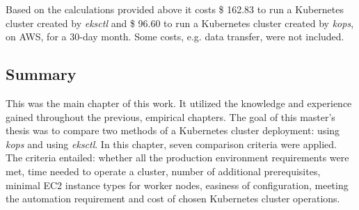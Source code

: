 Based on the calculations provided above it costs \$ 162.83 to run a Kubernetes cluster created by \textit{eksctl} and \$ 96.60 to run a Kubernetes cluster created by \textit{kops}, on AWS, for a 30-day month. Some costs, e.g. data transfer, were not included.




\subsection{Summary}

This was the main chapter of this work. It utilized the knowledge and experience gained throughout the previous, empirical chapters. The goal of this master's thesis was to compare two methods of a Kubernetes cluster deployment: using \textit{kops} and using \textit{eksctl}. In this chapter,  seven comparison criteria were applied. The criteria entailed: whether all the production environment requirements were met, time needed to operate a cluster, number of additional prerequisites, minimal EC2 instance types for worker nodes, easiness of configuration, meeting the automation requirement and cost of chosen Kubernetes cluster operations.

